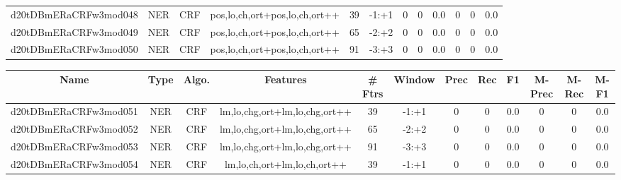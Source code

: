 \documentclass[a4paper]{article}
\begin{document}
\begin{landscape}
\begin{center}
\begin{tabular}{ |c|c|c|c|c|c|c|c|c|c|c|c|}
 
 	
 	\small{ d20tDBmERaCRFw3mod048 } & \small{ NER} & \small{  CRF }  & pos,lo,ch,ort+pos,lo,ch,ort++  &  39 &  \small{  -1:+1 }  &  0 & 0 & 0.0  &  0 & 0 & 0.0 \\
 	

 
 	
 	\small{ d20tDBmERaCRFw3mod049 } & \small{ NER} & \small{  CRF }  & pos,lo,ch,ort+pos,lo,ch,ort++  &  65 &  \small{  -2:+2 }  &  0 & 0 & 0.0  &  0 & 0 & 0.0 \\
 	

 
 	
 	\small{ d20tDBmERaCRFw3mod050 } & \small{ NER} & \small{  CRF }  & pos,lo,ch,ort+pos,lo,ch,ort++  &  91 &  \small{  -3:+3 }  &  0 & 0 & 0.0  &  0 & 0 & 0.0 \\
 	
 \hline
\end{tabular}
\end{center}




\begin{center}
\begin{tabular}{ |c|c|c|c|c|c|c|c|c|c|c|c|} 
 \hline
 	Name & Type & Algo. & Features & \# Ftrs & Window & Prec & Rec & F1 & M-Prec & M-Rec & M-F1\\
 \hline

 	

 
 	
 	\small{ d20tDBmERaCRFw3mod051 } & \small{ NER} & \small{  CRF }  & lm,lo,chg,ort+lm,lo,chg,ort++  &  39 &  \small{  -1:+1 }  &  0 & 0 & 0.0  &  0 & 0 & 0.0 \\
 	

 
 	
 	\small{ d20tDBmERaCRFw3mod052 } & \small{ NER} & \small{  CRF }  & lm,lo,chg,ort+lm,lo,chg,ort++  &  65 &  \small{  -2:+2 }  &  0 & 0 & 0.0  &  0 & 0 & 0.0 \\
 	

 
 	
 	\small{ d20tDBmERaCRFw3mod053 } & \small{ NER} & \small{  CRF }  & lm,lo,chg,ort+lm,lo,chg,ort++  &  91 &  \small{  -3:+3 }  &  0 & 0 & 0.0  &  0 & 0 & 0.0 \\
 	

 
 	
 	\small{ d20tDBmERaCRFw3mod054 } & \small{ NER} & \small{  CRF }  & lm,lo,ch,ort+lm,lo,ch,ort++  &  39 &  \small{  -1:+1 }  &  0 & 0 & 0.0  &  0 & 0 & 0.0 \\
 	


\end{tabular}
\end{center}
\end{landscape}
\end{document}
